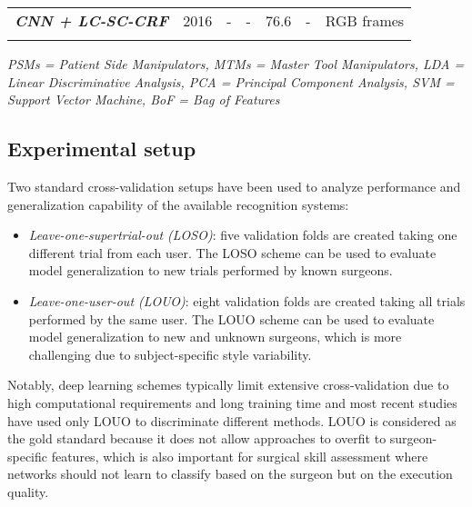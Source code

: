 \documentclass[journal]{IEEEtran}
\begin{document}
\begin{table*}[t]
\begin{threeparttable}
\begin{tabular}{m{2.9cm}|P{0.6cm}|cc|cc|m{9.0cm}}
             \textbf{\textit{CNN + LC-SC-CRF}} \scriptsize \cite{Rupprecht2016} & 2016 &- &-  &76.6 &-  & RGB frames\\
    		
    	\end{tabular}
    	\vspace{0.2 cm}
    	
    	\begin{tablenotes}
          \small
          \item \textit{PSMs = Patient Side Manipulators, MTMs = Master Tool Manipulators, LDA = Linear Discriminative Analysis, PCA = Principal Component Analysis, SVM = Support Vector Machine, BoF = Bag of Features}
        \end{tablenotes}
        
    \end{threeparttable}

    \label{table:ResultsGraphical}
\end{table*}


\subsection{Experimental setup}

Two standard cross-validation setups have been used to analyze performance and generalization capability of the available recognition systems:

\begin{itemize}
\item \textit{Leave-one-supertrial-out (LOSO)}: five validation folds are created taking one different trial from each user. The LOSO scheme can be used to evaluate model generalization to new trials performed by known surgeons.

\item \textit{Leave-one-user-out (LOUO)}: eight validation folds are created taking all trials performed by the same user.
The LOUO scheme can be used to evaluate model generalization to new and unknown surgeons, which is more challenging due to subject-specific style variability. 

\end{itemize}

Notably, deep learning schemes typically limit extensive cross-validation due to high computational requirements and long training time and most recent studies have used only LOUO to discriminate different methods. LOUO is considered as the gold standard because it does not allow approaches to overfit to surgeon-specific features, which is also important for surgical skill assessment where networks should not learn to classify based on the surgeon but on the execution quality. 
\end{document}
